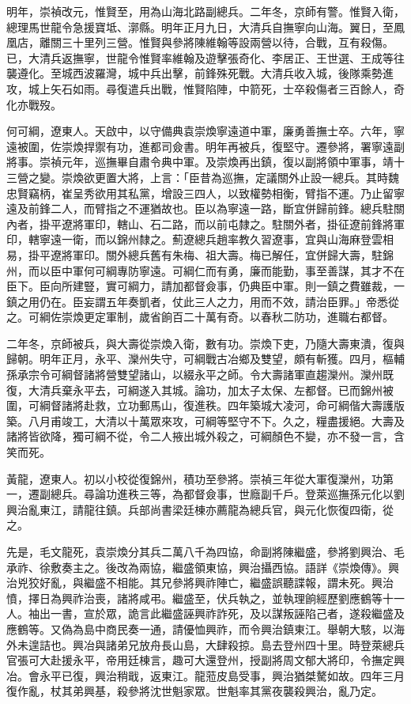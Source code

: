 \begin{pinyinscope}
明年，崇禎改元，惟賢至，用為山海北路副總兵。二年冬，京師有警。惟賢入衛，總理馬世龍令急援寶坻、漷縣。明年正月九日，大清兵自撫寧向山海。翼日，至鳳凰店，離關三十里列三營。惟賢與參將陳維翰等設兩營以待，合戰，互有殺傷。已，大清兵返撫寧，世龍令惟賢率維翰及遊擊張奇化、李居正、王世選、王成等往襲遵化。至城西波羅灣，城中兵出擊，前鋒殊死戰。大清兵收入城，後隊乘勢進攻，城上矢石如雨。尋復遣兵出戰，惟賢陷陣，中箭死，士卒殺傷者三百餘人，奇化亦戰歿。

何可綱，遼東人。天啟中，以守備典袁崇煥寧遠道中軍，廉勇善撫士卒。六年，寧遠被圍，佐崇煥捍禦有功，進都司僉書。明年再被兵，復堅守。遷參將，署寧遠副將事。崇禎元年，巡撫畢自肅令典中軍。及崇煥再出鎮，復以副將領中軍事，靖十三營之變。崇煥欲更置大將，上言：「臣昔為巡撫，定議關外止設一總兵。其時魏忠賢竊柄，崔呈秀欲用其私黨，增設三四人，以致權勢相衡，臂指不運。乃止留寧遠及前鋒二人，而臂指之不運猶故也。臣以為寧遠一路，斷宜併歸前鋒。總兵駐關內者，掛平遼將軍印，轄山、石二路，而以前屯隸之。駐關外者，掛征遼前鋒將軍印，轄寧遠一衛，而以錦州隸之。薊遼總兵趙率教久習遼事，宜與山海麻登雲相易，掛平遼將軍印。關外總兵舊有朱梅、祖大壽。梅已解任，宜併歸大壽，駐錦州，而以臣中軍何可綱專防寧遠。可綱仁而有勇，廉而能勤，事至善謀，其才不在臣下。臣向所建豎，實可綱力，請加都督僉事，仍典臣中軍。則一鎮之費雖裁，一鎮之用仍在。臣妄謂五年奏凱者，仗此三人之力，用而不效，請治臣罪。」帝悉從之。可綱佐崇煥更定軍制，歲省餉百二十萬有奇。以春秋二防功，進職右都督。

二年冬，京師被兵，與大壽從崇煥入衛，數有功。崇煥下吏，乃隨大壽東潰，復與歸朝。明年正月，永平、灤州失守，可綱戰古冶鄉及雙望，頗有斬獲。四月，樞輔孫承宗令可綱督諸將營雙望諸山，以綴永平之師。令大壽諸軍直趨灤州。灤州既復，大清兵棄永平去，可綱遂入其城。論功，加太子太保、左都督。已而錦州被圍，可綱督諸將赴救，立功郵馬山，復進秩。四年築城大凌河，命可綱偕大壽護版築。八月甫竣工，大清以十萬眾來攻，可綱等堅守不下。久之，糧盡援絕。大壽及諸將皆欲降，獨可綱不從，令二人掖出城外殺之，可綱顏色不變，亦不發一言，含笑而死。

黃龍，遼東人。初以小校從復錦州，積功至參將。崇禎三年從大軍復灤州，功第一，遷副總兵。尋論功進秩三等，為都督僉事，世廕副千戶。登萊巡撫孫元化以劉興治亂東江，請龍往鎮。兵部尚書梁廷棟亦薦龍為總兵官，與元化恢復四衛，從之。

先是，毛文龍死，袁崇煥分其兵二萬八千為四協，命副將陳繼盛，參將劉興治、毛承祚、徐敷奏主之。後改為兩協，繼盛領東協，興治攝西協。語詳《崇煥傳》。興治兇狡好亂，與繼盛不相能。其兄參將興祚陣亡，繼盛誤聽諜報，謂未死。興治憤，擇日為興祚治喪，諸將咸弔。繼盛至，伏兵執之，並執理餉經歷劉應鶴等十一人。袖出一書，宣於眾，詭言此繼盛誣興祚詐死，及以謀叛誣陷己者，遂殺繼盛及應鶴等。又偽為島中商民奏一通，請優恤興祚，而令興治鎮東江。舉朝大駭，以海外未遑詰也。興冶與諸弟兄放舟長山島，大肆殺掠。島去登州四十里。時登萊總兵官張可大赴援永平，帝用廷棟言，趣可大還登州，授副將周文郁大將印，令撫定興冶。會永平已復，興治稍戢，返東江。龍蒞皮島受事，興治猶桀驁如故。四年三月復作亂，杖其弟興基，殺參將沈世魁家眾。世魁率其黨夜襲殺興治，亂乃定。


\end{pinyinscope}
